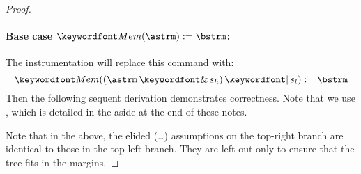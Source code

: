 \documentclass[11pt,twoside]{scrartcl}
\begin{document}
\begin{proof}
\paragraph{\textbf{Base case} $\pderef{\astrm}:=\bstrm$:} 
The instrumentation will replace this command with: 
\[
  \pderef{(\astrm \bitand s_h) \bitor s_l}:=\bstrm
\]
Then the following sequent derivation demonstrates correctness. Note that we use , which is detailed in the aside at the end of these notes.
\begin{sequentdeduction}
 {
}
\end{sequentdeduction}
Note that in the above, the elided (\ldots) assumptions on the top-right branch are identical to those in the top-left branch.
They are left out only to ensure that the tree fits in the margins.


\end{proof}
\end{document}
